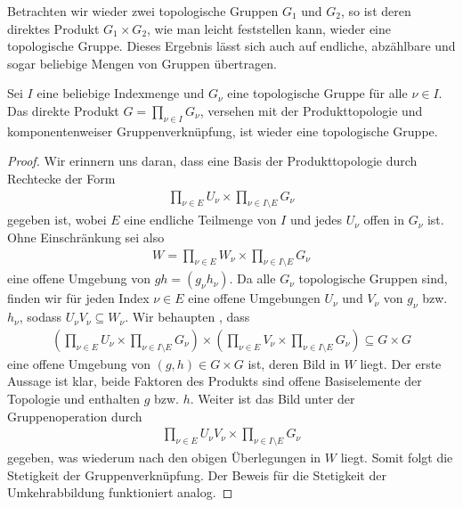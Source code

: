 	Betrachten wir wieder zwei topologische Gruppen $G_1$ und $G_2$, so ist deren direktes Produkt $G_1\times G_2$, wie man leicht feststellen kann, wieder eine topologische Gruppe.
	Dieses Ergebnis lässt sich auch auf endliche, abzählbare und sogar beliebige Mengen von Gruppen übertragen. 
	\begin{lemma}\label{lemma:topogroup:directproduct}
		Sei $I$ eine beliebige Indexmenge und $G_\nu$ eine topologische Gruppe für alle $\nu\in I$. 
		Das direkte Produkt $G = \prod_{\nu\in I} G_\nu$, versehen mit der Produkttopologie und komponentenweiser Gruppenverknüpfung, ist wieder eine topologische Gruppe.
	\end{lemma}
	\begin{proof}
		Wir erinnern uns daran, dass eine Basis der Produkttopologie durch Rechtecke der Form
		\begin{align*}
			\prod_{\nu\in E} U_\nu \times \prod_{\nu\in I\setminus E} G_\nu
		\end{align*}
		gegeben ist, wobei $E$ eine endliche Teilmenge von $I$ und jedes $U_\nu$ offen in $G_\nu$ ist. 
		Ohne Einschränkung sei also 
		\begin{align*}
			W = \prod_{\nu\in E} W_\nu \times \prod_{\nu\in I\setminus E} G_\nu
		\end{align*}
		eine offene Umgebung von $gh = (g_\nu h_\nu)$. 
		Da alle $G_\nu$ topologische Gruppen sind, finden wir für jeden Index $\nu\in E$ eine offene Umgebungen $U_\nu$ und $V_\nu$ von $g_\nu$ bzw. $h_\nu$, sodass $U_\nu V_\nu \subseteq W_\nu$. Wir behaupten , dass
		\begin{align*}
			(\prod_{\nu\in E} U_\nu \times \prod_{\nu\in I\setminus E} G_\nu) \times (\prod_{\nu\in E} V_\nu \times \prod_{\nu\in I\setminus E} G_\nu) \subseteq G \times G
		\end{align*}
		eine offene Umgebung von $(g, h) \in G \times G$ ist, deren Bild in $W$ liegt. 
		Der erste Aussage ist klar, beide Faktoren des Produkts sind offene Basiselemente der Topologie und enthalten $g$ bzw. $h$.
		Weiter ist das Bild unter der Gruppenoperation durch
		\begin{align*}
			\prod_{\nu\in E} U_\nu V_\nu \times \prod_{\nu\in I\setminus E} G_\nu
		\end{align*}
		gegeben, was wiederum nach den obigen Überlegungen in $W$ liegt.
		Somit folgt die Stetigkeit der Gruppenverknüpfung.
		Der Beweis für die Stetigkeit der Umkehrabbildung funktioniert analog.
	\end{proof}
	
